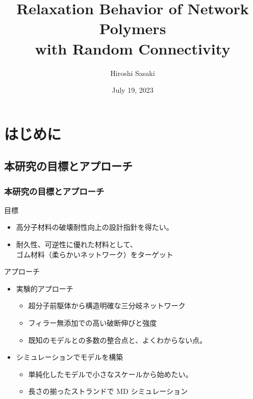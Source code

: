 \documentclass[12pt, dvipdfmx]{beamer}
\title
[Relaxation Behavior of Network Polymers with Random Connectivity]
{Relaxation Behavior of Network Polymers\\ with Random Connectivity}
\author[Toagosei H.Sasaki]{Hiroshi Sasaki}
\institute[Toagosei Co., Ltd.]{Toagosei Co., Ltd.}
\date{July 19, 2023}
\begin{document}
\setlength{\abovedisplayskip}{2pt} %
\setlength{\belowdisplayskip}{2pt} %

\begin{frame}[noframenumbering]\frametitle{}
	\titlepage
\end{frame}

\section{はじめに}

\subsection{本研究の目標とアプローチ}
\begin{frame}
    \frametitle{本研究の目標とアプローチ}
        \begin{block}{目標}
                \begin{itemize}
                    \item 高分子材料の破壊耐性向上の設計指針を得たい。
                    \item 耐久性、可逆性に優れた材料として、\\
					\alert{ゴム材料（柔らかいネットワーク）}をターゲット
                \end{itemize}
        \end{block}
		\begin{exampleblock}{アプローチ}
            \begin{itemize}
                \item 実験的アプローチ
                \begin{itemize}
                    \item 超分子前駆体から構造明確な三分岐ネットワーク
                    \item フィラー無添加での\alert{高い破断伸びと強度}
                    \item 既知のモデルとの多数の整合点と、\alert{よくわからない点}。
                \end{itemize}
                \item シミュレーションでモデルを構築
                \begin{itemize}
                    \item 単純化したモデルで小さなスケールから始めたい。
                    \item {長さの揃ったストランドで MD シミュレーション}
                \end{itemize}
            \end{itemize}
		\end{exampleblock}
\end{frame}
\end{document}
